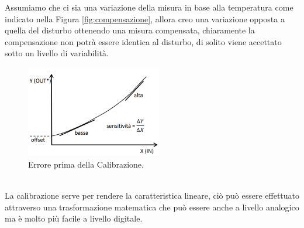 \documentclass[11pt, twocolumn]{article}
\begin{document}
Assumiamo che ci sia una variazione della misura in base alla temperatura come indicato nella Figura \ref{fig:compensazione}, allora creo una variazione opposta a quella del disturbo ottenendo una misura compensata, chiaramente la compensazione non potrà essere identica al disturbo, di solito viene accettato sotto un livello di variabilità.\\
\begin{figure}[!h]
  \centering
  \includegraphics[width=\linewidth,height=4cm]{imgs/calibrazione.png}
  \caption{Errore prima della Calibrazione.}
  \label{fig:calibrazione}
\end{figure}\\
La calibrazione serve per rendere la caratteristica lineare, ciò può essere effettuato attraverso una trasformazione matematica che può essere anche a livello analogico ma è molto più facile a livello digitale.
\end{document}
